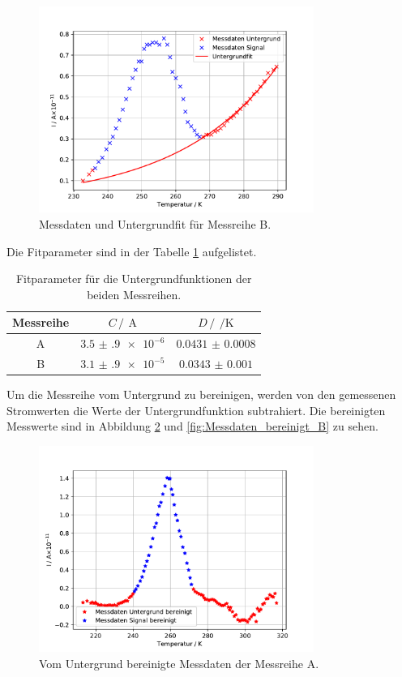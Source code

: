 \begin{figure}
    \centering
    \includegraphics[width =0.8\textwidth, keepaspectratio]{figure/Untergrundfit_B.pdf}
    \caption{Messdaten und Untergrundfit für Messreihe B.}
    \label{fig:Untergrund_B}
\end{figure}
\FloatBarrier
Die Fitparameter sind in der Tabelle \ref{tab:Fit_params_untergrund} aufgelistet.
\begin{table}
    \centering
    \caption{Fitparameter für die Untergrundfunktionen der beiden Messreihen.}
    \label{tab:Fit_params_untergrund}
    \begin{tabular}{c c c}
        \toprule
        Messreihe &$C\,/\,\SI{}{\ampere}$&$D\,/\,\SI{}{\per\kelvin}$\\
        \midrule
        A&$\num{3.5(9)e-6}$&$\num{0.0431(8)}$\\
        B&$\num{3.1(9)e-5}$&$\num{0.0343(10)}$\\
        \bottomrule
    \end{tabular}
\end{table}
\FloatBarrier
Um die Messreihe vom Untergrund zu bereinigen, werden von den gemessenen Stromwerten die Werte der Untergrundfunktion subtrahiert.
Die bereinigten Messwerte sind in Abbildung \ref{fig:Messdaten_bereinigt_A}
und \ref{fig:Messdaten_bereinigt_B} zu sehen.
\FloatBarrier
\begin{figure}
    \centering
    \includegraphics[width=0.8\textwidth,keepaspectratio]{figure/Messdate_rein_A.pdf}
    \caption{Vom Untergrund bereinigte Messdaten der Messreihe A.}
    \label{fig:Messdaten_bereinigt_A}
\end{figure}
